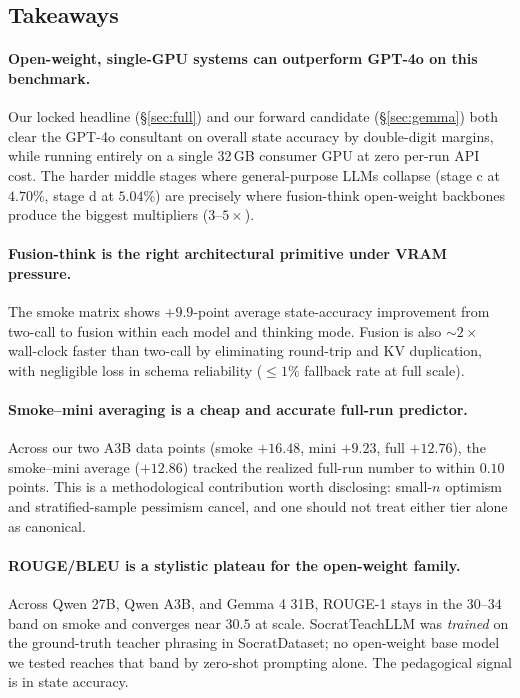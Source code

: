 \documentclass[11pt]{article}
\begin{document}
\subsection{Takeaways}
\label{sec:takeaways}

\paragraph{Open-weight, single-GPU systems can outperform GPT-4o on this benchmark.} Our locked headline (\S\ref{sec:full}) and our forward candidate (\S\ref{sec:gemma}) both clear the GPT-4o consultant on overall state accuracy by double-digit margins, while running entirely on a single 32\,GB consumer GPU at zero per-run API cost. The harder middle stages where general-purpose LLMs collapse (stage c at $4.70\%$, stage d at $5.04\%$) are precisely where fusion-think open-weight backbones produce the biggest multipliers ($3$--$5\times$).

\paragraph{Fusion-think is the right architectural primitive under VRAM pressure.} The smoke matrix shows $+9.9$-point average state-accuracy improvement from two-call to fusion within each model and thinking mode. Fusion is also $\sim 2\times$ wall-clock faster than two-call by eliminating round-trip and KV duplication, with negligible loss in schema reliability ($\leq 1\%$ fallback rate at full scale).

\paragraph{Smoke--mini averaging is a cheap and accurate full-run predictor.} Across our two A3B data points (smoke $+16.48$, mini $+9.23$, full $+12.76$), the smoke--mini average ($+12.86$) tracked the realized full-run number to within $0.10$ points. This is a methodological contribution worth disclosing: small-$n$ optimism and stratified-sample pessimism cancel, and one should not treat either tier alone as canonical.

\paragraph{ROUGE/BLEU is a stylistic plateau for the open-weight family.} Across Qwen 27B, Qwen A3B, and Gemma 4 31B, ROUGE-1 stays in the $30$--$34$ band on smoke and converges near $30.5$ at scale. SocratTeachLLM was \emph{trained} on the ground-truth teacher phrasing in SocratDataset; no open-weight base model we tested reaches that band by zero-shot prompting alone. The pedagogical signal is in state accuracy.
\end{document}
